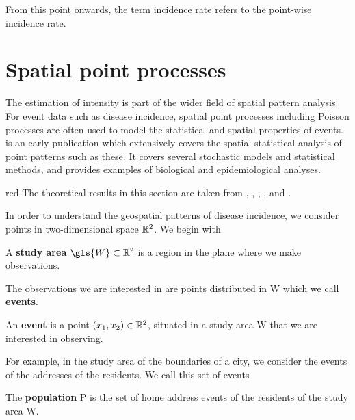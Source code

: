 From this point onwards, the term \gls{incidence rate} refers to the point-wise \gls{incidence rate}.

\section{Spatial point processes}
\label{sec:theory:spatial_point_processes}

The estimation of intensity is part of the wider field of spatial pattern analysis.
For event data such as disease incidence,
spatial point processes including Poisson processes are often used to model
the statistical and spatial properties of events.
 is an early publication which extensively covers
the spatial-statistical analysis of point patterns such as these.
It covers several stochastic models and statistical methods,
and provides examples of biological and epidemiological analyses.

\begin{color}{red}
The theoretical results in this section are taken from \citet{diggle1983spatial},
\citet{diggle1988equivalence},
\citet{guan2008consistent},
\citet{silverman1986density},
and \citet{wand1994kernel}.
\end{color}

In order to understand the geospatial patterns of disease incidence,
we consider points in two-dimensional space $\mathbb{R}^2$.
We begin with

\begin{defn}
    \label{defn:studyarea}
    A \textbf{study area} $\gls{W} \subset \RS$ is a region in the plane where we make observations.
\end{defn}

The observations we are interested in are points distributed in \gls{W} which we call \textbf{events}.

\begin{defn}
    \label{defn:event}
    An \textbf{event} is a point $(x_1, x_2) \in \mathbb{R}^2$, situated in a study area \gls{W} that we are interested in observing.
\end{defn}

For example, in the study area of the boundaries of a city, we consider the events of the addresses of the residents.
We call this set of events

\begin{defn}
    The \textbf{population} \gls{P} is the set of home address events of the residents of the study area \gls{W}.
\end{defn}


